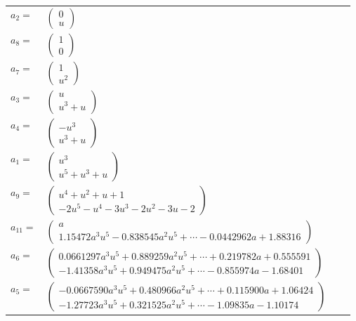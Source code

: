 \documentclass[1p]{elsarticle_modified}
\theoremstyle{definition}
\begin{document}
\begin{tabular}{m{7pt} m{180pt} m{7pt} m{180pt} }
\flushright $a_{2}=$&$\begin{pmatrix}0\\u\end{pmatrix}$ \\
\flushright $a_{8}=$&$\begin{pmatrix}1\\0\end{pmatrix}$ \\
\flushright $a_{7}=$&$\begin{pmatrix}1\\u^2\end{pmatrix}$ \\
\flushright $a_{3}=$&$\begin{pmatrix}u\\u^3+u\end{pmatrix}$ \\
\flushright $a_{4}=$&$\begin{pmatrix}- u^3\\u^3+u\end{pmatrix}$ \\
\flushright $a_{1}=$&$\begin{pmatrix}u^3\\u^5+u^3+u\end{pmatrix}$ \\
\flushright $a_{9}=$&$\begin{pmatrix}u^4+u^2+u+1\\-2 u^5- u^4-3 u^3-2 u^2-3 u-2\end{pmatrix}$ \\
\flushright $a_{11}=$&$\begin{pmatrix}a\\1.15472 a^{3} u^{5}-0.838545 a^{2} u^{5}+\cdots-0.0442962 a+1.88316\end{pmatrix}$ \\
\flushright $a_{6}=$&$\begin{pmatrix}0.0661297 a^{3} u^{5}+0.889259 a^{2} u^{5}+\cdots+0.219782 a+0.555591\\-1.41358 a^{3} u^{5}+0.949475 a^{2} u^{5}+\cdots-0.855974 a-1.68401\end{pmatrix}$ \\
\flushright $a_{5}=$&$\begin{pmatrix}-0.0667590 a^{3} u^{5}+0.480966 a^{2} u^{5}+\cdots+0.115900 a+1.06424\\-1.27723 a^{3} u^{5}+0.321525 a^{2} u^{5}+\cdots-1.09835 a-1.10174\end{pmatrix}$ \\

\end{tabular}
\end{document}
